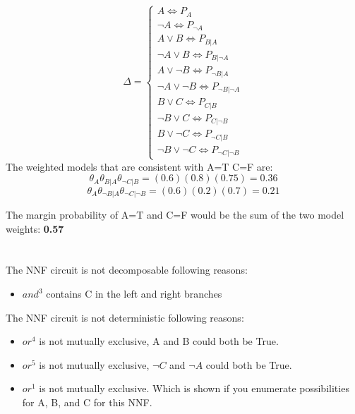 \documentclass{article}
\begin{document}
 \section{}
 \[ \Delta = \begin{cases} 
      A \iff P_{A} \\
      \lnot A \iff P_{\lnot A} \\
      A \lor B \iff P_{B|A} \\
      \lnot A \lor B \iff P_{B|\lnot A} \\
      A \lor \lnot B \iff P_{\lnot B|A} \\
      \lnot A \lor \lnot B \iff P_{\lnot B|\lnot A} \\
      B \lor C \iff P_{C|B} \\
      \lnot B \lor C \iff P_{C|\lnot B} \\
      B \lor \lnot C \iff P_{\lnot C|B} \\
      \lnot B \lor \lnot C \iff P_{\lnot C|\lnot B}
   \end{cases}
\]
The weighted models that are consistent with A=T C=F are:
\[\theta_{A}\theta_{B|A}\theta_{\lnot C|B} = (0.6)(0.8)(0.75) = 0.36\]
\[\theta_{A}\theta_{\lnot B|A}\theta_{\lnot C|\lnot B} = (0.6)(0.2)(0.7) = 0.21\]

The margin probability of A=T and C=F would be the sum of the two model weights: \textbf{0.57}
 \clearpage
 \section{}
The NNF circuit is not decomposable following reasons:
\begin{itemize}
    \item $and^{3}$ contains C in the left and right branches
\end{itemize}
The NNF circuit is not deterministic following reasons:
\begin{itemize}
 \item $or^{4}$ is not mutually exclusive, A and B could both be True.
 \item $or^{5}$ is not mutually exclusive, $\lnot C$ and $\lnot A$ could both be True.
 \item $or^{1}$ is not mutually exclusive. Which is shown if you enumerate possibilities for A, B, and C for this NNF.
\end{itemize}
 \clearpage
 \section{}

\clearpage
\section{}

\clearpage
\section{}

\clearpage
\section{}
\end{document}
